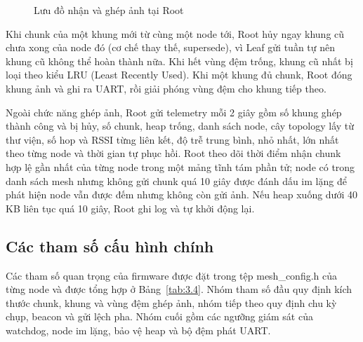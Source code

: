 \begin{figure}[!htbp]
\centering

\caption{Lưu đồ nhận và ghép ảnh tại Root}\label{fig:3.5}
\end{figure}

Khi chunk của một khung mới từ cùng một node tới, Root hủy ngay khung cũ chưa xong của node đó (cơ chế thay thế, supersede), vì Leaf gửi tuần tự nên khung cũ không thể hoàn thành nữa. Khi hết vùng đệm trống, khung cũ nhất bị loại theo kiểu LRU (Least Recently Used). Khi một khung đủ chunk, Root đóng khung ảnh và ghi ra UART, rồi giải phóng vùng đệm cho khung tiếp theo.

Ngoài chức năng ghép ảnh, Root gửi telemetry mỗi 2 giây gồm số khung ghép thành công và bị hủy, số chunk, heap trống, danh sách node, cây topology lấy từ thư viện, số hop và RSSI từng liên kết, độ trễ trung bình, nhỏ nhất, lớn nhất theo từng node và thời gian tự phục hồi. Root theo dõi thời điểm nhận chunk hợp lệ gần nhất của từng node trong một mảng tĩnh tám phần tử; node có trong danh sách mesh nhưng không gửi chunk quá 10 giây được đánh dấu im lặng để phát hiện node vẫn được đếm nhưng không còn gửi ảnh. Nếu heap xuống dưới 40 KB liên tục quá 10 giây, Root ghi log và tự khởi động lại.


\subsection{Các tham số cấu hình chính}

Các tham số quan trọng của firmware được đặt trong tệp mesh\_config.h của từng node và được tổng hợp ở Bảng~\ref{tab:3.4}. Nhóm tham số đầu quy định kích thước chunk, khung và vùng đệm ghép ảnh, nhóm tiếp theo quy định chu kỳ chụp, beacon và gửi lệch pha. Nhóm cuối gồm các ngưỡng giám sát của watchdog, node im lặng, bảo vệ heap và bộ đệm phát UART.


